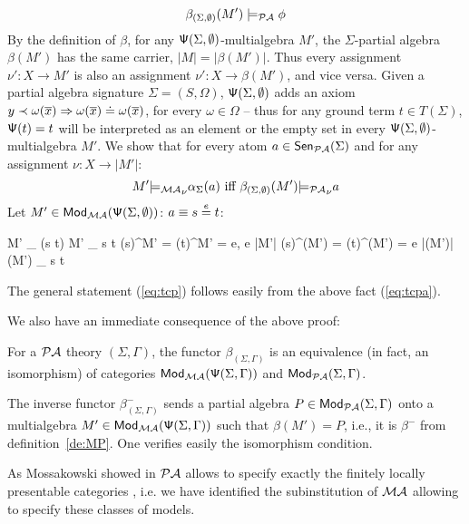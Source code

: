\documentclass[10pt]{article}
\begin{document}
\begin{PROOF}
\begin{equation}
\beta_{(\Sigma,\emptyset)} (M') \models_{{\mathcal{PA}}} \phi  
\end{equation}
\noindent
By the definition of $\beta$, for any ${\sf {\Psi}}(\Sigma,\emptyset)$-multialgebra
$M'$, the $\Sigma$-partial algebra $\beta(M')$ has the same carrier, $|M|=
|\beta(M')|$. Thus every assignment $\nu': X \to M'$ is also an assignment
$\nu': X \to \beta(M')$, and vice versa.  Given a partial algebra signature
$\Sigma=(S,\Omega)$, ${\sf {\Psi}}(\Sigma,\emptyset)$ adds an axiom $ y \prec
\omega(\overline{x}) \Rightarrow \omega(\overline{x}) \mathrel{\dot{=} } \omega(\overline{x})$,
for every $\omega \in \Omega$ -- thus for any ground term $t\in T(\Sigma)$,
${\sf {\Psi}}(t)=t$ will be interpreted as an element or the empty set in every
${\sf {\Psi}}(\Sigma,\emptyset)$-multialgebra $M'$.  We show that for every atom $a
\in {\sf {Sen}}_{{\mathcal{PA}}}(\Sigma)$ and for any assignment $\nu:X\to|M'|$:
\begin{equation}\label{eq:tcpa}
M' {\models_{{\mathcal{MA}}}}_{\nu} \alpha_{\Sigma}(a) \mbox{ iff 
} \beta_{(\Sigma,\emptyset)} (M') {\models_{{\mathcal{PA}}}}_{\nu} a
\end{equation}
%
Let $M' \in {\sf {Mod}}_{{\mathcal{MA}}}({\sf {\Psi}}(\Sigma,\emptyset))$:
$a \equiv s \stackrel{e}{=} t$:	
		\begin{eqp}
			M' \models_{\nu} \alpha(s \eequal t)
			M' \models_{\nu} s \eleq t
			{\nu}(s)^{M'} = {\nu}(t)^{M'} = {e}, e \in |M'|
			{\nu}(s)^{\beta(M')} = {\nu}(t)^{\beta(M')} = e \in 
|\beta(M')|
			{\beta(M')} \models_{\nu} s \eequal t
		\end{eqp}
The general statement (\ref{eq:tcp}) follows easily from the above fact (\ref{eq:tcpa}).
\end{PROOF}
We also have an immediate consequence of the above proof:
\begin{fact}\label{fa:iso}
For a ${\mathcal{PA}}$ theory $(\Sigma,\Gamma)$, 
the functor $\beta_{(\Sigma,\Gamma)}$ is an equivalence (in fact, an
isomorphism) of categories ${\sf {Mod}}_{{\mathcal{MA}}}({\sf {\Psi}}(\Sigma,\Gamma))$ and
${\sf {Mod}}_{{\mathcal{PA}}}(\Sigma,\Gamma)$. 
\end{fact}
\begin{PROOF}
The
inverse functor $\beta^{-}_{(\Sigma,\Gamma)}$ sends a partial algebra
$P\in{\sf {Mod}}_{{\mathcal{PA}}}(\Sigma,\Gamma)$ onto a multialgebra
$M'\in{\sf {Mod}}_{{\mathcal{MA}}}({\sf {\Psi}}(\Sigma,\Gamma))$ such that $\beta(M')=P$, i.e.,
it is $\beta^-$ from definition~\ref{de:MP}. One verifies easily the
isomorphism condition.
\end{PROOF}
%
As Mossakowski showed in \cite{mossa} ${\mathcal{PA}}$ allows to
specify exactly the finitely locally presentable categories \cite{locally},
i.e. we have identified the subinstitution of ${\mathcal{MA}}$ allowing to specify
these classes of models. 
\end{document}
